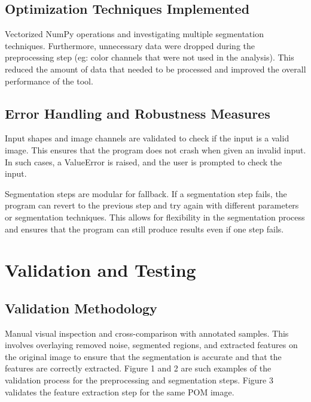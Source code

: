 \documentclass[12pt]{article}
\begin{document}
\subsection{Optimization Techniques Implemented}
Vectorized NumPy operations and investigating multiple segmentation techniques.
Furthermore, unnecessary data were dropped during the preprocessing step (eg: color channels that were not used in the analysis).
This reduced the amount of data that needed to be processed and improved the overall performance of the tool.



\subsection{Error Handling and Robustness Measures}
Input shapes and image channels are validated to check if the input is a valid image. This ensures that the program does not 
crash when given an invalid input. In such cases, a ValueError is raised, and the user is prompted to check the input.

Segmentation steps are modular for fallback. If a segmentation step fails, the program can revert to the previous step and 
try again with different parameters or segmentation techniques.
This allows for flexibility in the segmentation process and ensures that the program can still produce results even if one 
step fails.

\section{Validation and Testing}

\subsection{Validation Methodology}
Manual visual inspection and cross-comparison with annotated samples. This involves overlaying removed noise, segmented regions, and
extracted features on the original image to ensure that the segmentation is accurate and that the features are correctly extracted.
Figure 1 and 2 are such examples of the validation process for the preprocessing and segmentation steps. Figure 3 validates the feature extraction step for the 
same POM image.
\end{document}
